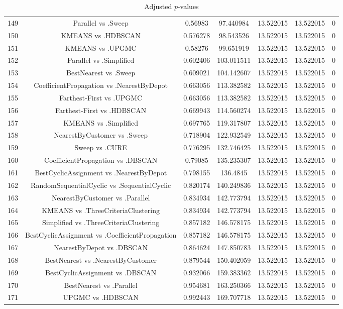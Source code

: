 \documentclass[a4paper,10pt]{article}
\begin{document}
\begin{landscape}
\begin{table}[!htp]
\begin{tabular}{ccccccc}
149&Parallel vs .Sweep&0.56983&97.440984&13.522015&13.522015&0\\
150&KMEANS vs .HDBSCAN&0.576278&98.543526&13.522015&13.522015&0\\
151&KMEANS vs .UPGMC&0.58276&99.651919&13.522015&13.522015&0\\
152&Parallel vs .Simplified&0.602406&103.011511&13.522015&13.522015&0\\
153&BestNearest vs .Sweep&0.609021&104.142607&13.522015&13.522015&0\\
154&CoefficientPropagation vs .NearestByDepot&0.663056&113.382582&13.522015&13.522015&0\\
155&Farthest-First vs .UPGMC&0.663056&113.382582&13.522015&13.522015&0\\
156&Farthest-First vs .HDBSCAN&0.669943&114.560274&13.522015&13.522015&0\\
157&KMEANS vs .Simplified&0.697765&119.317807&13.522015&13.522015&0\\
158&NearestByCustomer vs .Sweep&0.718904&122.932549&13.522015&13.522015&0\\
159&Sweep vs .CURE&0.776295&132.746425&13.522015&13.522015&0\\
160&CoefficientPropagation vs .DBSCAN&0.79085&135.235307&13.522015&13.522015&0\\
161&BestCyclicAssignment vs .NearestByDepot&0.798155&136.4845&13.522015&13.522015&0\\
162&RandomSequentialCyclic vs .SequentialCyclic&0.820174&140.249836&13.522015&13.522015&0\\
163&NearestByCustomer vs .Parallel&0.834934&142.773794&13.522015&13.522015&0\\
164&KMEANS vs .ThreeCriteriaClustering&0.834934&142.773794&13.522015&13.522015&0\\
165&Simplified vs .ThreeCriteriaClustering&0.857182&146.578175&13.522015&13.522015&0\\
166&BestCyclicAssignment vs .CoefficientPropagation&0.857182&146.578175&13.522015&13.522015&0\\
167&NearestByDepot vs .DBSCAN&0.864624&147.850783&13.522015&13.522015&0\\
168&BestNearest vs .NearestByCustomer&0.879544&150.402059&13.522015&13.522015&0\\
169&BestCyclicAssignment vs .DBSCAN&0.932066&159.383362&13.522015&13.522015&0\\
170&BestNearest vs .Parallel&0.954681&163.250366&13.522015&13.522015&0\\
171&UPGMC vs .HDBSCAN&0.992443&169.707718&13.522015&13.522015&0\\
\hline
\end{tabular}
\caption{Adjusted $p$-values}
\end{table}

\end{landscape}
\end{document}
